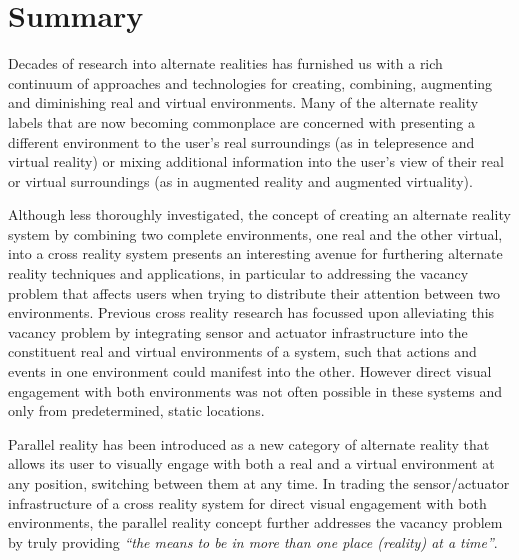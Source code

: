 


\section{Summary}
Decades of research into alternate realities has furnished us with a rich continuum of approaches and technologies for creating, combining, augmenting and diminishing real and virtual environments. Many of the alternate reality labels that are now becoming commonplace are concerned with presenting a different environment to the user's real surroundings (as in telepresence and virtual reality) or mixing additional information into the user's view of their real or virtual surroundings (as in augmented reality and augmented virtuality).

Although less thoroughly investigated, the concept of creating an alternate reality system by combining two complete environments, one real and the other virtual, into a cross reality system presents an interesting avenue for furthering alternate reality techniques and applications, in particular to addressing the vacancy problem that affects users when trying to distribute their attention between two environments. Previous cross reality research has focussed upon alleviating this vacancy problem by integrating sensor and actuator infrastructure into the constituent real and virtual environments of a system, such that actions and events in one environment could manifest into the other. However direct visual engagement with both environments was not often possible in these systems and only from predetermined, static locations.

Parallel reality has been introduced as a new category of alternate reality that allows its user to visually engage with both a real and a virtual environment at any position, switching between them at any time. In trading the sensor/actuator infrastructure of a cross reality system for direct visual engagement with both environments, the parallel reality concept further addresses the vacancy problem by truly providing \textit{``the means to be in more than one place (reality) at a time''}\cite{Lifton2007a}.